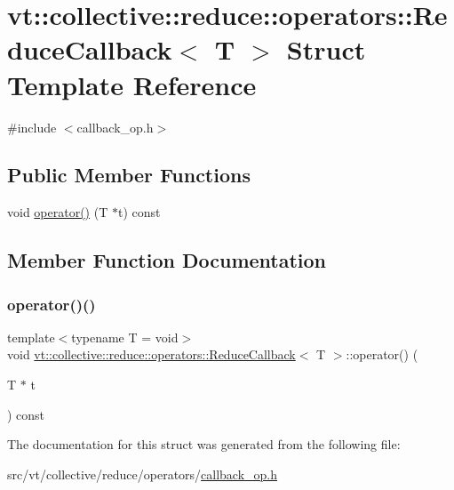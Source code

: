 \hypertarget{structvt_1_1collective_1_1reduce_1_1operators_1_1_reduce_callback}{}\section{vt\+:\+:collective\+:\+:reduce\+:\+:operators\+:\+:Reduce\+Callback$<$ T $>$ Struct Template Reference}
\label{structvt_1_1collective_1_1reduce_1_1operators_1_1_reduce_callback}


{\ttfamily \#include $<$callback\+\_\+op.\+h$>$}

\subsection*{Public Member Functions}
\begin{DoxyCompactItemize}
\item 
void \hyperlink{structvt_1_1collective_1_1reduce_1_1operators_1_1_reduce_callback_ad76a1678fdfeed8c0ab57ede31b8e191}{operator()} (T $\ast$t) const
\end{DoxyCompactItemize}


\subsection{Member Function Documentation}
\mbox{\label{structvt_1_1collective_1_1reduce_1_1operators_1_1_reduce_callback_ad76a1678fdfeed8c0ab57ede31b8e191}} 
\subsubsection{\texorpdfstring{operator()()}{operator()()}}
{\footnotesize\ttfamily template$<$typename T  = void$>$ \\
void \hyperlink{structvt_1_1collective_1_1reduce_1_1operators_1_1_reduce_callback}{vt\+::collective\+::reduce\+::operators\+::\+Reduce\+Callback}$<$ T $>$\+::operator() (\begin{DoxyParamCaption}\item[{T $\ast$}]{t }\end{DoxyParamCaption}) const\hspace{0.3cm}{\ttfamily [inline]}}



The documentation for this struct was generated from the following file\+:\begin{DoxyCompactItemize}
\item 
src/vt/collective/reduce/operators/\hyperlink{callback__op_8h}{callback\+\_\+op.\+h}\end{DoxyCompactItemize}
